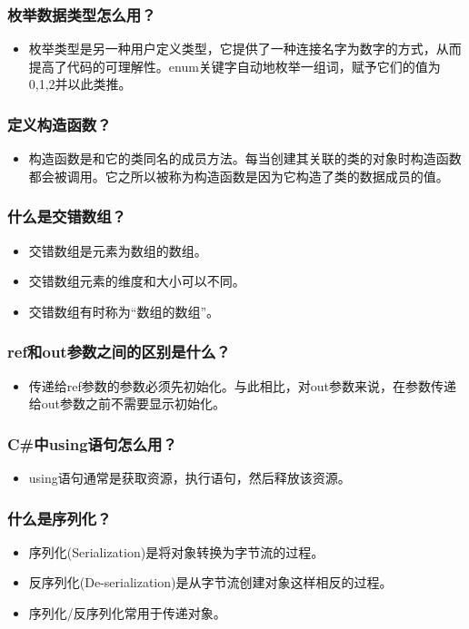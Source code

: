 \documentclass[9pt, b5paper]{article}
\begin{document}
\subsubsection{枚举数据类型怎么用？}
\label{sec-1-2-63}
\begin{itemize}
\item 枚举类型是另一种用户定义类型，它提供了一种连接名字为数字的方式，从而提高了代码的可理解性。enum关键字自动地枚举一组词，赋予它们的值为0,1,2并以此类推。
\end{itemize}
\subsubsection{定义构造函数？}
\label{sec-1-2-64}
\begin{itemize}
\item 构造函数是和它的类同名的成员方法。每当创建其关联的类的对象时构造函数都会被调用。它之所以被称为构造函数是因为它构造了类的数据成员的值。
\end{itemize}
\subsubsection{什么是交错数组？}
\label{sec-1-2-65}
\begin{itemize}
\item 交错数组是元素为数组的数组。
\item 交错数组元素的维度和大小可以不同。
\item 交错数组有时称为“数组的数组”。
\end{itemize}
\subsubsection{ref和out参数之间的区别是什么？}
\label{sec-1-2-66}
\begin{itemize}
\item 传递给ref参数的参数必须先初始化。与此相比，对out参数来说，在参数传递给out参数之前不需要显示初始化。
\end{itemize}
\subsubsection{C\#中using语句怎么用？}
\label{sec-1-2-67}
\begin{itemize}
\item using语句通常是获取资源，执行语句，然后释放该资源。
\end{itemize}
\subsubsection{什么是序列化？}
\label{sec-1-2-68}
\begin{itemize}
\item 序列化(Serialization)是将对象转换为字节流的过程。
\item 反序列化(De-serialization)是从字节流创建对象这样相反的过程。
\item 序列化/反序列化常用于传递对象。
\end{itemize}
\end{document}
